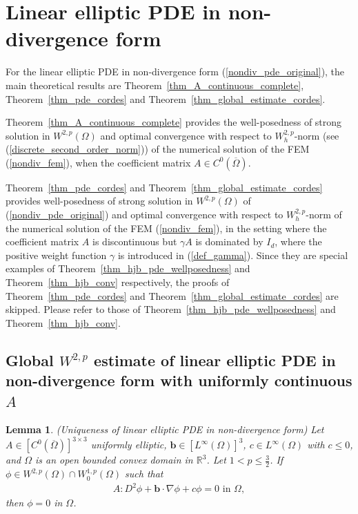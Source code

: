 \documentclass[12pt]{amsart}
\newtheorem{lemma}{Lemma}[section]
\theoremstyle{definition}
\theoremstyle{remark}
\begin{document}
\section{Linear elliptic PDE in non-divergence form} 
\label{sec_nondiv}

For the linear elliptic PDE in non-divergence form (\ref{nondiv_pde_original}), 
the main theoretical results are Theorem~\ref{thm_A_continuous_complete}, 
Theorem~\ref{thm_pde_cordes} and Theorem~\ref{thm_global_estimate_cordes}. 

Theorem~\ref{thm_A_continuous_complete} 
provides the well-posedness of strong solution in $W^{2,p}(\Omega)$ and optimal convergence 
with respect to $W_{h}^{2,p}$-norm (see (\ref{discrete_second_order_norm})) of the numerical 
solution of the FEM (\ref{nondiv_fem}), when the coefficient matrix 
$A \in C^{0}(\overline{\Omega})$. 

Theorem~\ref{thm_pde_cordes} and Theorem~\ref{thm_global_estimate_cordes} provides 
well-posedness of strong solution in $W^{2,p}(\Omega)$ of (\ref{nondiv_pde_original}) and 
optimal convergence with respect to $W_{h}^{2,p}$-norm of the numerical 
solution of the FEM (\ref{nondiv_fem}), in the setting where the coefficient matrix $A$
is discontinuous but $\gamma A$ is dominated by $I_{d}$, where the positive weight function 
$\gamma$ is introduced in (\ref{def_gamma}).
Since they are special examples of Theorem~\ref{thm_hjb_pde_wellposedness} and Theorem~\ref{thm_hjb_conv} 
respectively, the proofs of Theorem~\ref{thm_pde_cordes} and Theorem~\ref{thm_global_estimate_cordes} are skipped.
Please refer to those of Theorem~\ref{thm_hjb_pde_wellposedness} and Theorem~\ref{thm_hjb_conv}.

\subsection{Global $W^{2,p}$ estimate of linear elliptic PDE in non-divergence form 
with uniformly continuous $A$}  

\begin{lemma}
\label{lemma_pde_unique1}
(Uniqueness of linear elliptic PDE in non-divergence form)
Let $A \in [C^{0}(\overline{\Omega})]^{3\times 3}$ uniformly elliptic, $\boldsymbol{b}\in 
[L^{\infty}(\Omega)]^{3}$, $c \in L^{\infty}(\Omega)$ with $c \leq 0$, 
and $\Omega$ is an open bounded convex domain in $\mathbb{R}^{3}$. 
Let $1 < p \leq \frac{3}{2}$. 
If $\phi \in W^{2,p}(\Omega) \cap W_{0}^{1,p}(\Omega)$ such that 
\begin{align*}
A:D^{2} \phi + \boldsymbol{b}\cdot \nabla \phi + c \phi = 0 \text{ in } \Omega,
\end{align*}
then $\phi = 0$ in $\Omega$.
\end{lemma}
\end{document}
